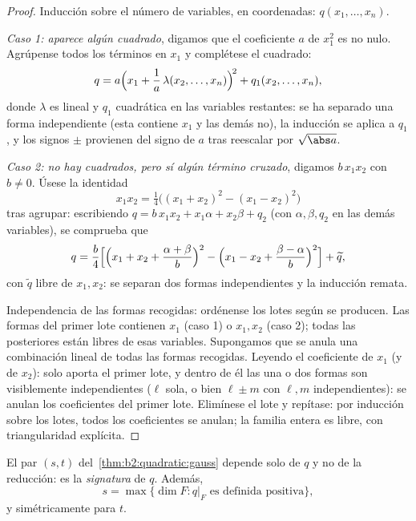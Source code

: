 \begin{proof}
Inducción sobre el número de variables, en coordenadas: $q(x_1,
\dots, x_n)$.

\emph{Caso 1: aparece algún cuadrado}, digamos que el coeficiente
$a$ de $x_1^2$ es no nulo. Agrúpense todos los términos en $x_1$ y
complétese el cuadrado:
\[
q = a\Bigl(x_1 + \frac{1}{a}\,\lambda(x_2, \dots,
x_n)\Bigr)^{\!2} + q_1(x_2, \dots, x_n),
\]
donde $\lambda$ es lineal y $q_1$ cuadrática en las variables
restantes: se ha separado una forma independiente (esta contiene
$x_1$ y las demás no), la inducción se aplica a $q_1$, y los signos
$\pm$ provienen del signo de $a$ tras reescalar por $\sqrt{\abs a}$.

\emph{Caso 2: no hay cuadrados, pero sí algún término cruzado},
digamos $b\,x_1x_2$ con $b \neq 0$. Úsese la identidad
\[
x_1x_2 = \tfrac14\bigl((x_1 + x_2)^2 - (x_1 - x_2)^2\bigr)
\]
tras agrupar: escribiendo $q = b\,x_1x_2 + x_1\alpha + x_2\beta +
q_2$ (con $\alpha, \beta, q_2$ en las demás variables), se comprueba
que
\[
q = \frac{b}{4}\Bigl[\Bigl(x_1 + x_2 + \frac{\alpha +
\beta}{b}\Bigr)^{2} - \Bigl(x_1 - x_2 + \frac{\beta -
\alpha}{b}\Bigr)^{2}\Bigr] + \widetilde q ,
\]
con $\widetilde q$ libre de $x_1, x_2$: se separan dos formas
independientes y la inducción remata.

Independencia de las formas recogidas: ordénense los lotes según se
producen. Las formas del primer lote contienen $x_1$ (caso 1) o
$x_1, x_2$ (caso 2); todas las posteriores están libres de esas
variables. Supongamos que se anula una combinación lineal de todas
las formas recogidas. Leyendo el coeficiente de $x_1$ (y de $x_2$):
solo aporta el primer lote, y dentro de él las una o dos formas son
visiblemente independientes ($\ell$ sola, o bien $\ell \pm m$ con
$\ell, m$ independientes): se anulan los coeficientes del primer
lote. Elimínese el lote y repítase: por inducción sobre los lotes,
todos los coeficientes se anulan; la familia entera es libre, con
triangularidad explícita.
\end{proof}

\begin{theorem}\label{thm:b2:quadratic:sylvester}
El par $(s, t)$ del~\cref{thm:b2:quadratic:gauss} depende solo de
$q$ y no de la reducción: es la \emph{signatura} de $q$. Además,
\[
s = \max\{\dim F : q|_F \text{ es definida positiva}\},
\]
y simétricamente para $t$.
\end{theorem}

